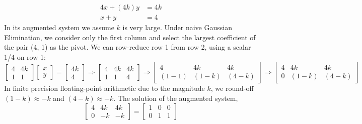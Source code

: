 \documentclass[7pt]{article}
\begin{document}
\begin{equation*}
\begin{split}
4x + (4k)y & = 4k \\
x + y & = 4
\end{split}
\end{equation*}
In its augmented system  we assume $k$ is  very large. Under naive Gaussian Elimination, we consider only the first column and select the largest coefficient of the pair (4, 1) as the pivot. We can row-reduce row 1 from row 2, using a scalar 1/4 on row 1:
\begin{equation*}
\left[
\begin{array}{cc}%
4 & 4k  \\  
1& 1
\end{array}  
\right]
\left[
\begin{array}{c}%
x \\  
y
\end{array}  
\right]
=
\left[
\begin{array}{c}%
4k \\  
4
\end{array}  
\right]
\Rightarrow
\left[
\begin{array}{cc|c}%
4 & 4k & 4k \\  
1& 1& 4
\end{array}  
\right]
\Rightarrow
\left[
\begin{array} {cc|c}%
4 & 4k & 4k \\  
(1 - 1) & (1 - k)& (4 - k)
\end{array}  
\right]
\Rightarrow
\left[
\begin{array} {cc|c}%
4 & 4k & 4k \\  
0 & (1 - k)& (4 - k)
\end{array}  
\right]
\end{equation*}
In finite precision floating-point arithmetic due to the magnitude $k$, we round-off $(1 - k) \approx -k$ and $(4 - k) \approx -k$. The solution of the augmented system, 
\begin{equation*}
\left[
\begin{array} {cc|c}%
4 & 4k & 4k \\  
0 & -k & -k
\end{array} \right]  = \left[ \begin{array} {cc|c}%
1 & 0 & 0 \\  
0 & 1 & 1
\end{array} 
\right]
\end{equation*}
\end{document}
